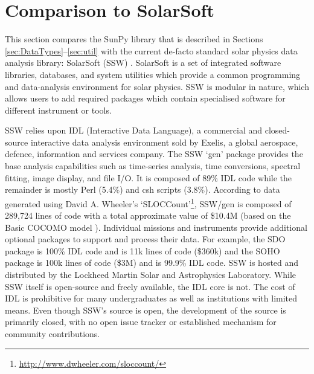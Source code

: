 \section{Comparison to SolarSoft}
This section compares the SunPy library that is described in Sections 
\ref{sec:DataTypes}--\ref{sec:util} with the current de-facto standard solar 
physics data analysis library: SolarSoft (SSW) \citep{freeland1998}.
SolarSoft is a set of integrated software libraries, databases, and system 
utilities which provide a common programming and data-analysis environment for 
solar physics. SSW is modular in nature, which allows users to add required 
packages which contain specialised software for different instrument or tools.

SSW relies upon IDL (Interactive Data 
Language), a commercial and closed-source interactive data analysis environment 
sold by Exelis, a global aerospace, defence, information and services company. 
The SSW `gen' package provides the base analysis capabilities such as time-series
analysis, time conversions, spectral fitting, image display, and file 
I/O. It is composed of 89\% IDL code while the remainder is mostly Perl (5.4\%) 
and csh scripts (3.8\%). 
According to data generated using David A. Wheeler's `SLOCCount'\footnote{\url{http://www.dwheeler.com/sloccount/}}, SSW/gen is composed of 
289,724 lines of code with a total approximate value of \$10.4M (based on the 
Basic COCOMO model \citep{_cocomo_2014}). 
Individual missions and instruments provide additional optional packages to 
support and process their data. For example, the SDO package \citep{sdo} is 
100\% IDL code and is 11k lines of code (\$360k) and the SOHO package 
\citep{soho} is 100k lines of code (\$3M) and is 99.9\% IDL code. SSW is hosted 
and distributed by the Lockheed Martin Solar and Astrophysics Laboratory.
While SSW itself is open-source and freely available, the IDL core is not. The cost 
of IDL is prohibitive for many undergraduates as well as institutions 
with limited means.
Even though SSW's source is open, the development of the source is primarily closed,
with no open issue tracker or established mechanism for community contributions.

